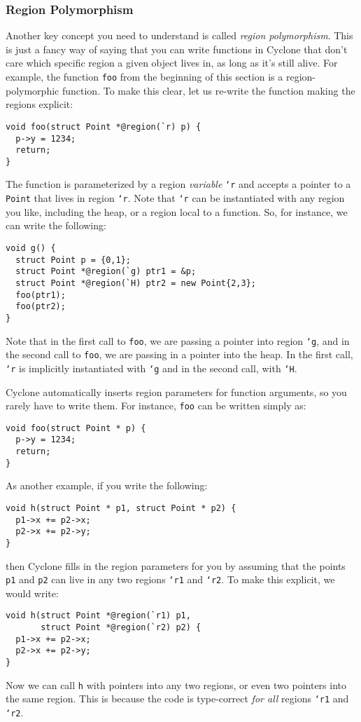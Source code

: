 \subsubsection*{Region Polymorphism}

Another key concept you need to understand is called
\emph{region polymorphism}.  This is just a fancy way of saying
that you can write functions in Cyclone that don't care which
specific region a given object lives in, as long as it's still
alive.  For example, the function \texttt{foo} from the beginning
of this section is a region-polymorphic function.  To make this
clear, let us re-write the function making the regions explicit:
\begin{verbatim}
void foo(struct Point *@region(`r) p) {
  p->y = 1234;
  return;
}
\end{verbatim}
The function is parameterized by a region \emph{variable} \texttt{`r}
and accepts a pointer to a \texttt{Point} that lives in region
\texttt{`r}.  Note that \texttt{`r} can be instantiated with
any region you like, including the heap, or a region local to
a function.  So, for instance, we can write the following:
\begin{verbatim}
void g() {
  struct Point p = {0,1};
  struct Point *@region(`g) ptr1 = &p;
  struct Point *@region(`H) ptr2 = new Point{2,3};
  foo(ptr1);
  foo(ptr2);
}
\end{verbatim}
Note that in the first call to \texttt{foo}, we are passing
a pointer into region \texttt{`g}, and in the second call to 
\texttt{foo}, we are passing in a pointer into the heap.  In
the first call, \texttt{`r} is implicitly instantiated with
\texttt{`g} and in the second call, with \texttt{`H}.  

Cyclone automatically inserts region parameters for function
arguments, so you rarely have to write them.  For instance,
\texttt{foo} can be written simply as:
\begin{verbatim}
void foo(struct Point * p) {
  p->y = 1234;
  return;
}
\end{verbatim}
As another example, if you write the following:
\begin{verbatim}
void h(struct Point * p1, struct Point * p2) {
  p1->x += p2->x;
  p2->x += p2->y;
}
\end{verbatim}
then Cyclone fills in the region parameters for you by assuming
that the points \texttt{p1} and \texttt{p2} can live in any
two regions \texttt{`r1} and \texttt{`r2}.  To make this explicit,
we would write:
\begin{verbatim}
void h(struct Point *@region(`r1) p1, 
       struct Point *@region(`r2) p2) {
  p1->x += p2->x;
  p2->x += p2->y;
}
\end{verbatim}
Now we can call \texttt{h} with pointers into any two regions,
or even two pointers into the same region.  This is because
the code is type-correct \emph{for all} regions \texttt{`r1} and \texttt{`r2}.

